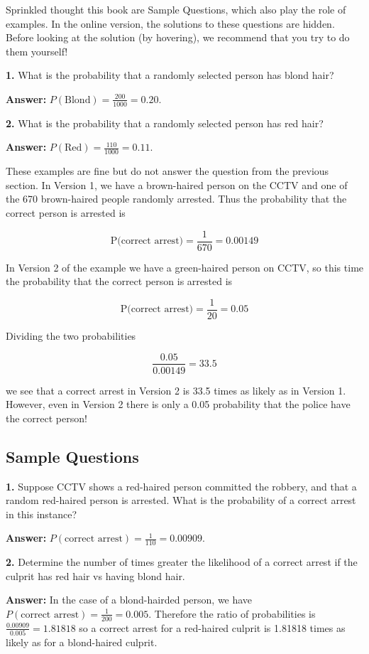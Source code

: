 \documentclass[
]{book}
\begin{document}
Sprinkled thought this book are Sample Questions, which also play the role
of examples. In the online version, the
solutions to these questions are hidden. Before looking at the solution
(by hovering), we recommend that you try to do them yourself!

\textbf{1.} What is the probability that a randomly selected person has blond hair?

\textbf{Answer:} \(P(\text{Blond}) = \frac{200}{1000} = 0.20\).

\textbf{2.} What is the probability that a randomly selected person has red hair?

\textbf{Answer:} \(P(\text{Red}) = \frac{110}{1000} = 0.11\).

These examples are fine but do not answer the question from the previous section.
In Version 1, we have a brown-haired person on the CCTV and one of the
670 brown-haired people randomly arrested.
Thus the probability that the correct person is arrested is

\[\mbox{P(correct arrest)} = \frac{1}{670} = 0.00149\]

In Version 2 of the example we have a green-haired person on CCTV, so this
time the probability that the correct person is arrested is

\[\mbox{P(correct arrest)} = \frac{1}{20} = 0.05\]

Dividing the two probabilities

\[\frac{0.05}{0.00149} = 33.5\]

we see that a correct arrest in Version 2 is 33.5 times as likely as in Version 1.
However, even in Version 2 there is only a 0.05 probability that the police have
the correct person!

\hypertarget{sample-questions-1}{%
\subsection{Sample Questions}\label{sample-questions-1}}

\textbf{1.} Suppose CCTV shows a red-haired person committed the robbery, and that
a random red-haired person is arrested. What is the probability of a correct
arrest in this instance?

\textbf{Answer:} \(P(\text{correct arrest}) = \frac{1}{110} = 0.00909\).

\textbf{2.} Determine the number of times greater the likelihood of a correct arrest
if the culprit has red hair vs having blond hair.

\textbf{Answer:} In the case of a blond-hairded person, we have
\(P(\text{correct arrest}) = \frac{1}{200} = 0.005\). Therefore the ratio
of probabilities is
\(\frac{0.00909}{0.005} = 1.81818\)
so a correct arrest for a red-haired culprit is 1.81818 times as likely
as for a blond-haired culprit.
\end{document}
